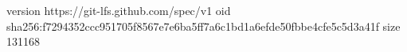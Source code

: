 version https://git-lfs.github.com/spec/v1
oid sha256:f7294352ccc951705f8567e7e6ba5ff7a6c1bd1a6efde50fbbe4cfe5c5d3a41f
size 131168
